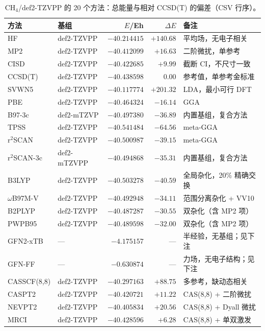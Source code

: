 \begin{table}[t]
\centering
\caption{CH$_4$/def2-TZVPP 的 20 个方法：总能量与相对 CCSD(T) 的偏差（CSV 行序）。}
\label{ch:16:tab:ch4-summary}
{\small
\begin{tabular}{@{}l l r r p{4.15cm}@{}}
\toprule
方法 & 基组 & $E$/Eh & $\Delta E$ & 备注 \\
\midrule
HF            & def2-TZVPP   & $-40.214415$ & $+140.68$ & 平均场，无电子相关 \\
MP2           & def2-TZVPP   & $-40.412099$ & $+16.63$  & 二阶微扰，单参考 \\
CISD          & def2-TZVPP   & $-40.422685$ & $+9.99$   & 截断 CI，不尺寸一致 \\
CCSD(T)       & def2-TZVPP   & $-40.438598$ & $0.00$    & 参考值，单参考金标准 \\
SVWN5         & def2-TZVPP   & $-40.117774$ & $+201.32$ & LDA，最小可行 DFT \\
PBE           & def2-TZVPP   & $-40.464324$ & $-16.14$  & GGA \\
B97-3c        & def2-mTZVP   & $-40.497380$ & $-36.89$  & 内置基组，复合方法 \\
TPSS          & def2-TZVPP   & $-40.541484$ & $-64.56$  & meta-GGA \\
r$^2$SCAN     & def2-TZVPP   & $-40.500987$ & $-39.15$  & meta-GGA \\
r$^2$SCAN-3c  & def2-mTZVPP  & $-40.494868$ & $-35.31$  & 内置基组，复合方法 \\
B3LYP         & def2-TZVPP   & $-40.503278$ & $-40.59$  & 全局杂化，20\% 精确交换 \\
$\omega$B97M-V & def2-TZVPP  & $-40.492948$ & $-34.11$  & 范围分离杂化 + VV10 \\
B2PLYP        & def2-TZVPP   & $-40.487287$ & $-30.55$  & 双杂化（含 MP2 项） \\
PWPB95        & def2-TZVPP   & $-40.489598$ & $-32.00$  & 双杂化（含 MP2 项） \\
GFN2-xTB      & —            & $-4.175157$  & —         & 半经验，无基组；见下注 \\
GFN-FF        & —            & $-0.630874$  & —         & 力场，无电子结构；见下注 \\
CASSCF(8,8)   & def2-TZVPP   & $-40.297163$ & $+88.75$  & 多参考，缺动态相关 \\
CASPT2        & def2-TZVPP   & $-40.420721$ & $+11.22$  & CAS(8,8) + 二阶微扰 \\
NEVPT2        & def2-TZVPP   & $-40.405834$ & $+20.56$  & CAS(8,8) + Dyall 微扰 \\
MRCI          & def2-TZVPP   & $-40.428596$ & $+6.28$   & CAS(8,8) + 单双激发 \\
\bottomrule
\end{tabular}
}


\end{table}
